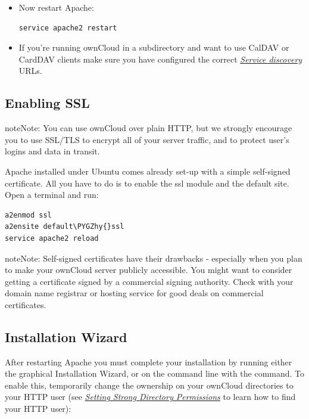 \documentclass[letterpaper,10pt,english]{sphinxmanual}
\def\PYGZhy{\char`\-}
\begin{document}
\begin{itemize}
\item {} 
Now restart Apache:

\begin{Verbatim}[commandchars=\\\{\}]
service apache2 restart
\end{Verbatim}

\item {} 
If you're running ownCloud in a subdirectory and want to use CalDAV or
CardDAV clients make sure you have configured the correct
{\hyperref[issues/general_troubleshooting:service\string-discovery\string-label]{\emph{Service discovery}}} URLs.

\end{itemize}


\subsection{Enabling SSL}
\label{installation/source_installation:enabling-ssl-label}\label{installation/source_installation:enabling-ssl}
\begin{notice}{note}{Note:}
You can use ownCloud over plain HTTP, but we strongly encourage you to
use SSL/TLS to encrypt all of your server traffic, and to protect
user's logins and data in transit.
\end{notice}

Apache installed under Ubuntu comes already set-up with a simple
self-signed certificate. All you have to do is to enable the ssl module and
the default site. Open a terminal and run:

\begin{Verbatim}[commandchars=\\\{\}]
a2enmod ssl
a2ensite default\PYGZhy{}ssl
service apache2 reload
\end{Verbatim}

\begin{notice}{note}{Note:}
Self-signed certificates have their drawbacks - especially when you
plan to make your ownCloud server publicly accessible. You might want
to consider getting a certificate signed by a commercial signing
authority. Check with your domain name registrar or hosting service
for good deals on commercial certificates.
\end{notice}


\subsection{Installation Wizard}
\label{installation/source_installation:installation-wizard}\label{installation/source_installation:installation-wizard-label}
After restarting Apache you must complete your installation by running either
the graphical Installation Wizard, or on the command line with the 
command. To enable this, temporarily change the ownership on your ownCloud
directories to your HTTP user (see {\hyperref[installation/installation_wizard:strong\string-perms\string-label]{\emph{Setting Strong Directory Permissions}}} to learn how to
find your HTTP user):
\end{document}
